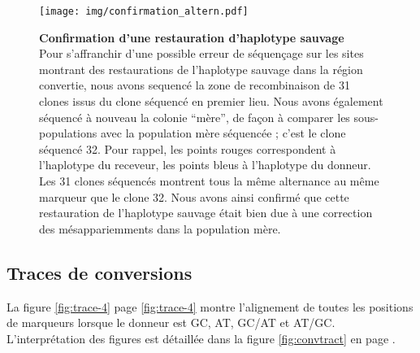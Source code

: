 \begin{figure}[h!]
  \centering
  \texttt{[image: img/confirmation\_altern.pdf]}
  \caption[Confirmation des restaurations]{\label{fig:confirm-haplotype}
    \textbf{Confirmation d'une restauration d'haplotype sauvage} \\
    \rmfamily Pour s'affranchir d'une possible erreur de séquençage sur les
    sites montrant des restaurations de l'haplotype sauvage dans la région
    convertie, nous avons sequencé la zone de recombinaison de 31 clones issus
    du clone séquencé en premier lieu. Nous avons également séquencé à nouveau
    la colonie ``mère'', de façon à comparer les sous-populations avec la
    population mère séquencée ; c'est le clone séquencé \num{32}. Pour rappel,
    les points rouges correspondent à l'haplotype du receveur, les points bleus
    à l'haplotype du donneur. Les 31 clones séquencés montrent tous la même
    alternance au même marqueur que le clone 32. Nous avons ainsi confirmé que
    cette restauration de l'haplotype sauvage était bien due à une correction
    des mésappariemments dans la population mère. }
\end{figure}

\subsection{Traces de conversions}
\label{subsec:trac-de-conv}

La figure \ref{fig:trace-4} page \ref{fig:trace-4} montre l'alignement de toutes
les positions de marqueurs lorsque le donneur est GC, AT, GC/AT et AT/GC.
L'interprétation des figures est détaillée dans la figure \ref{fig:convtract} en
page \pageref{fig:convtract}.





